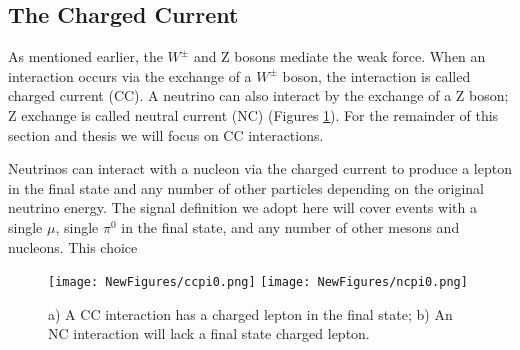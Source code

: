 \documentclass[12pt]{article}
\begin{document}
\subsection{The Charged Current}
As mentioned earlier, the $W^\pm$ and Z bosons mediate the weak force. When an interaction occurs via the exchange of a $W^\pm$ boson, the interaction is called charged current (CC).  A neutrino can also interact by the exchange of a Z boson; Z exchange is called neutral current (NC) (Figures \ref{fig:CCNC}). For the remainder of this section and thesis we will focus on CC interactions. 

Neutrinos can interact with a nucleon via the charged current to produce a lepton in the final state and any number of other particles depending on the original neutrino energy. The signal definition we adopt here will cover events with a single $\mu$, single $\pi^0$ in the final state, and any number of other mesons and nucleons. This choice



\begin{figure}[H]
\centering
\texttt{[image: NewFigures/ccpi0.png]}
\hspace{3 mm}
\texttt{[image: NewFigures/ncpi0.png]}
\caption{a) A CC interaction has a charged lepton in the final state; b) An NC interaction will lack a final state charged lepton.} 
\label{fig:CCNC}
\end{figure}
\end{document}
